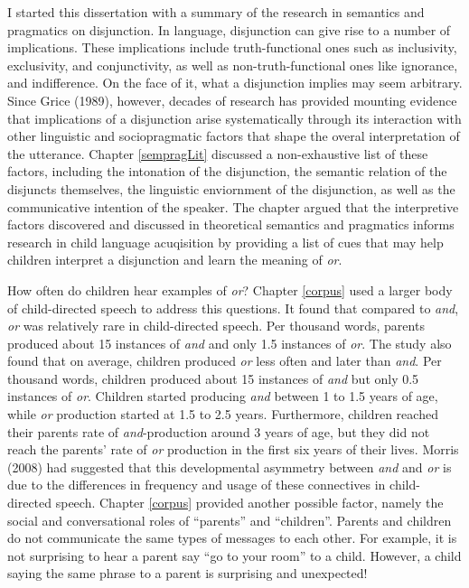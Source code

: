 \documentclass[oneside]{report}
\theoremstyle{definition}
\theoremstyle{definition}
\theoremstyle{definition}
\theoremstyle{remark}
\begin{document}
I started this dissertation with a summary of the research in semantics
and pragmatics on disjunction. In language, disjunction can give rise to
a number of implications. These implications include truth-functional
ones such as inclusivity, exclusivity, and conjunctivity, as well as
non-truth-functional ones like ignorance, and indifference. On the face
of it, what a disjunction implies may seem arbitrary. Since Grice
(1989), however, decades of research has provided mounting evidence that
implications of a disjunction arise systematically through its
interaction with other linguistic and sociopragmatic factors that shape
the overal interpretation of the utterance. Chapter \ref{sempragLit}
discussed a non-exhaustive list of these factors, including the
intonation of the disjunction, the semantic relation of the disjuncts
themselves, the linguistic enviornment of the disjunction, as well as
the communicative intention of the speaker. The chapter argued that the
interpretive factors discovered and discussed in theoretical semantics
and pragmatics informs research in child language acuqisition by
providing a list of cues that may help children interpret a disjunction
and learn the meaning of \emph{or}.

How often do children hear examples of \emph{or}? Chapter \ref{corpus}
used a larger body of child-directed speech to address this questions.
It found that compared to \emph{and}, \emph{or} was relatively rare in
child-directed speech. Per thousand words, parents produced about 15
instances of \emph{and} and only 1.5 instances of \emph{or}. The study
also found that on average, children produced \emph{or} less often and
later than \emph{and}. Per thousand words, children produced about 15
instances of \emph{and} but only 0.5 instances of \emph{or}. Children
started producing \emph{and} between 1 to 1.5 years of age, while
\emph{or} production started at 1.5 to 2.5 years. Furthermore, children
reached their parents rate of \emph{and}-production around 3 years of
age, but they did not reach the parents' rate of \emph{or} production in
the first six years of their lives. Morris (2008) had suggested that
this developmental asymmetry between \emph{and} and \emph{or} is due to
the differences in frequency and usage of these connectives in
child-directed speech. Chapter \ref{corpus} provided another possible
factor, namely the social and conversational roles of ``parents'' and
``children''. Parents and children do not communicate the same types of
messages to each other. For example, it is not surprising to hear a
parent say ``go to your room'' to a child. However, a child saying the
same phrase to a parent is surprising and unexpected!
\end{document}
